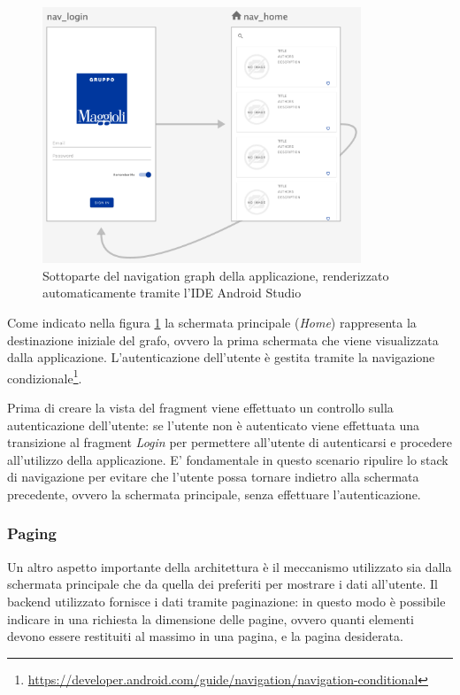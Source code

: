 \begin{figure}[H]
    \centering
    \includegraphics[width=0.85\textwidth]{img/android-nav-graph.png}
    \caption{Sottoparte del navigation graph della applicazione, renderizzato automaticamente tramite l'IDE Android Studio}
    \label{android-nav-graph-png}
\end{figure}

Come indicato nella figura \ref{android-nav-graph-png} la schermata principale (\textit{Home}) rappresenta la destinazione iniziale del grafo, ovvero la prima schermata che viene visualizzata dalla applicazione. L'autenticazione dell'utente è gestita tramite la navigazione condizionale\footnote{\href{https://developer.android.com/guide/navigation/navigation-conditional}{https://developer.android.com/guide/navigation/navigation-conditional}}. 

Prima di creare la vista del fragment viene effettuato un controllo sulla autenticazione dell'utente: se l'utente non è autenticato viene effettuata una transizione al fragment \textit{Login} per permettere all'utente di autenticarsi e procedere all'utilizzo della applicazione. E' fondamentale in questo scenario ripulire lo stack di navigazione per evitare che l'utente possa tornare indietro alla schermata precedente, ovvero la schermata principale, senza effettuare l'autenticazione.

\subsubsection*{Paging}
\label{pagingsec}
Un altro aspetto importante della architettura è il meccanismo utilizzato sia dalla schermata principale che da quella dei preferiti per mostrare i dati all'utente. Il backend utilizzato fornisce i dati tramite paginazione: in questo modo è possibile indicare in una richiesta la dimensione delle pagine, ovvero quanti elementi devono essere restituiti al massimo in una pagina, e la pagina desiderata. 

